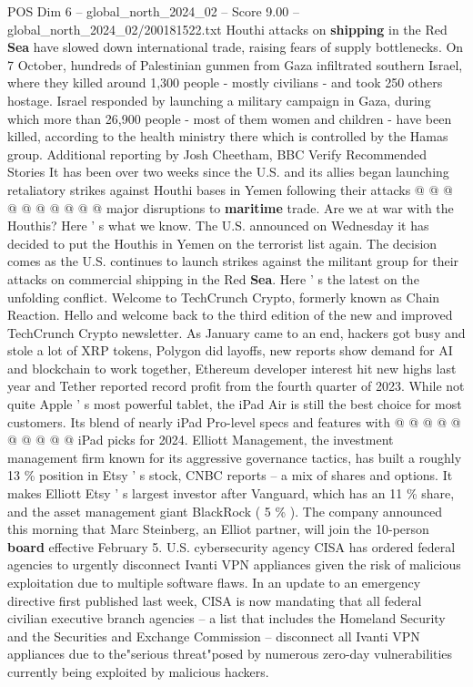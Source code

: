 \begin{textsample}{POS Dim 6 – global\_north\_2024\_02 – Score 9.00 – global\_north\_2024\_02/200181522.txt}
Houthi attacks on \textbf{shipping} in the Red \textbf{Sea} have slowed down international trade, raising fears of supply bottlenecks.
On 7 October, hundreds of Palestinian gunmen from Gaza infiltrated southern Israel, where they killed around 1,300 people - mostly civilians - and took 250 others hostage.
Israel responded by launching a military campaign in Gaza, during which more than 26,900 people - most of them women and children - have been killed, according to the health ministry there which is controlled by the Hamas group.
Additional reporting by Josh Cheetham, BBC Verify Recommended Stories It has been over two weeks since the U.S. and its allies began launching retaliatory strikes against Houthi bases in Yemen following their attacks @ @ @ @ @ @ @ @ @ @ major disruptions to \textbf{maritime} trade.
Are we at war with the Houthis?
Here ' s what we know.
The U.S. announced on Wednesday it has decided to put the Houthis in Yemen on the terrorist list again.
The decision comes as the U.S. continues to launch strikes against the militant group for their attacks on commercial shipping in the Red \textbf{Sea}.
Here ' s the latest on the unfolding conflict.
Welcome to TechCrunch Crypto, formerly known as Chain Reaction.
Hello and welcome back to the third edition of the new and improved TechCrunch Crypto newsletter.
As January came to an end, hackers got busy and stole a lot of XRP tokens, Polygon did layoffs, new reports show demand for AI and blockchain to work together, Ethereum developer interest hit new highs last year and Tether reported record profit from the fourth quarter of 2023.
While not quite Apple ' s most powerful tablet, the iPad Air is still the best choice for most customers.
Its blend of nearly iPad Pro-level specs and features with @ @ @ @ @ @ @ @ @ @ iPad picks for 2024.
Elliott Management, the investment management firm known for its aggressive governance tactics, has built a roughly 13 \% position in Etsy ' s stock, CNBC reports -- a mix of shares and options.
It makes Elliott Etsy ' s largest investor after Vanguard, which has an 11 \% share, and the asset management giant BlackRock ( 5 \% ).
The company announced this morning that Marc Steinberg, an Elliot partner, will join the 10-person \textbf{board} effective February 5.
U.S. cybersecurity agency CISA has ordered federal agencies to urgently disconnect Ivanti VPN appliances given the risk of malicious exploitation due to multiple software flaws.
In an update to an emergency directive first published last week, CISA is now mandating that all federal civilian executive branch agencies -- a list that includes the Homeland Security and the Securities and Exchange Commission -- disconnect all Ivanti VPN appliances due to the"serious threat"posed by numerous zero-day vulnerabilities currently being exploited by malicious hackers.

\end{textsample}
